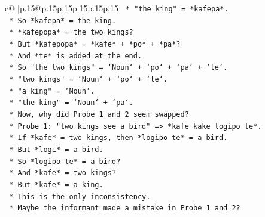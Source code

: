 \documentclass{article}
\begin{document}
{\begin{supertabular}{c@{$\;$}|p{.15\linewidth}@{}p{.15\linewidth}p{.15\linewidth}p{.15\linewidth}p{.15\linewidth}p{.15\linewidth}}
{{{\texttt{                                                        *   "the king" = *kafepa*.} \\
\texttt{                                                        *   So *kafepa* = the king.} \\
\texttt{                                                        *   *kafepopa* = the two kings?} \\
\texttt{                                                        *   But *kafepopa* = *kafe* + *po* + *pa*?} \\
\texttt{                                                        *   And *te* is added at the end.} \\
\texttt{                                                        *   So "the two kings" = `Noun` + `po` + `pa` + `te`.} \\
\texttt{                                                        *   "two kings" = `Noun` + `po` + `te`.} \\
\texttt{                                                        *   "a king" = `Noun`.} \\
\texttt{                                                        *   "the king" = `Noun` + `pa`.} \\
\texttt{                                                    *   Now, why did Probe 1 and 2 seem swapped?} \\
\texttt{                                                    *   Probe 1: "two kings see a bird" => *kafe kake logipo te*.} \\
\texttt{                                                        *   If *kafe* = two kings, then *logipo te* = a bird.} \\
\texttt{                                                        *   But *logi* = a bird.} \\
\texttt{                                                        *   So *logipo te* = a bird?} \\
\texttt{                                                        *   And *kafe* = two kings?} \\
\texttt{                                                        *   But *kafe* = a king.} \\
\texttt{                                                        *   This is the only inconsistency.} \\
\texttt{                                                        *   Maybe the informant made a mistake in Probe 1 and 2?} \\
}}}
\end{supertabular}}
\end{document}
